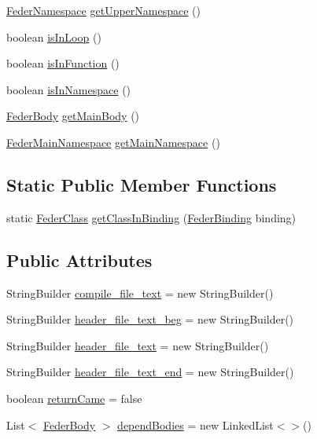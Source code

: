 \begin{DoxyCompactItemize}
\item 
\hyperlink{classfeder_1_1types_1_1FederNamespace}{Feder\+Namespace} \hyperlink{classfeder_1_1types_1_1FederBody_a8ab3e023c05b44cdfbd4e7f22aa9844b}{get\+Upper\+Namespace} ()
\item 
boolean \hyperlink{classfeder_1_1types_1_1FederBody_adf3772434a48f9ac4d203a5e8b7c11fc}{is\+In\+Loop} ()
\item 
boolean \hyperlink{classfeder_1_1types_1_1FederBody_ab3f37b7b8ea9806ea13856f993e11902}{is\+In\+Function} ()
\item 
boolean \hyperlink{classfeder_1_1types_1_1FederBody_a0947a2d7c8ada0a1960fc1536c25731b}{is\+In\+Namespace} ()
\item 
\hyperlink{classfeder_1_1types_1_1FederBody}{Feder\+Body} \hyperlink{classfeder_1_1types_1_1FederBody_ac69fba3b468b2f0ab66d7a87cc501da6}{get\+Main\+Body} ()
\item 
\hyperlink{classfeder_1_1types_1_1FederMainNamespace}{Feder\+Main\+Namespace} \hyperlink{classfeder_1_1types_1_1FederBody_a88b8e80235ad8b5b8dc92e7e2e9daaca}{get\+Main\+Namespace} ()
\end{DoxyCompactItemize}
\subsection*{Static Public Member Functions}
\begin{DoxyCompactItemize}
\item 
static \hyperlink{classfeder_1_1types_1_1FederClass}{Feder\+Class} \hyperlink{classfeder_1_1types_1_1FederBody_a7e2624283680ec9dfd0a6816da173540}{get\+Class\+In\+Binding} (\hyperlink{classfeder_1_1types_1_1FederBinding}{Feder\+Binding} binding)
\end{DoxyCompactItemize}
\subsection*{Public Attributes}
\begin{DoxyCompactItemize}
\item 
String\+Builder \hyperlink{classfeder_1_1types_1_1FederBody_a4735b22113042ca2cb86572c6b982e25}{compile\+\_\+file\+\_\+text} = new String\+Builder()
\item 
String\+Builder \hyperlink{classfeder_1_1types_1_1FederBody_ac834fd62ff90240400dfcddc5e1f4c1f}{header\+\_\+file\+\_\+text\+\_\+beg} = new String\+Builder()
\item 
String\+Builder \hyperlink{classfeder_1_1types_1_1FederBody_af6ffc7aab354eec7f4ea73decc489f24}{header\+\_\+file\+\_\+text} = new String\+Builder()
\item 
String\+Builder \hyperlink{classfeder_1_1types_1_1FederBody_a765165e7c3baabd64219b1968ff6beab}{header\+\_\+file\+\_\+text\+\_\+end} = new String\+Builder()
\item 
boolean \hyperlink{classfeder_1_1types_1_1FederBody_a4602832966e1e3fa19cf19f06a69aa07}{return\+Came} = false
\item 
List$<$ \hyperlink{classfeder_1_1types_1_1FederBody}{Feder\+Body} $>$ \hyperlink{classfeder_1_1types_1_1FederBody_a833aa456985af005fa923bc8771cca7a}{depend\+Bodies} = new Linked\+List$<$$>$()
\end{DoxyCompactItemize}
